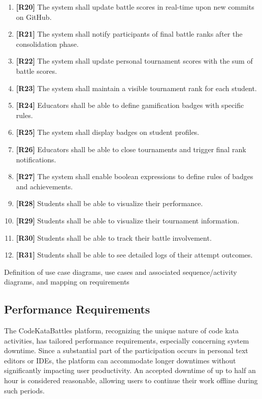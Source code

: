 \begin{enumerate}
    \item \textbf{[R20]} The system shall update battle scores in real-time upon new commits on GitHub.
    \item \textbf{[R21]} The system shall notify participants of final battle ranks after the consolidation phase.
    \item \textbf{[R22]} The system shall update personal tournament scores with the sum of battle scores.
    \item \textbf{[R23]} The system shall maintain a visible tournament rank for each student.
    \item \textbf{[R24]} Educators shall be able to define gamification badges with specific rules.
    \item \textbf{[R25]} The system shall display badges on student profiles.
    \item \textbf{[R26]} Educators shall be able to close tournaments and trigger final rank notifications.
    \item \textbf{[R27]} The system shall enable boolean expressions to define rules of badges and achievements.
    \item \textbf{[R28]} Students shall be able to visualize their performance.
    \item \textbf{[R29]} Students shall be able to visualize their tournament information.
    \item \textbf{[R30]} Students shall be able to track their battle involvement.
    \item \textbf{[R31]} Students shall be able to see detailed logs of their attempt outcomes.
\end{enumerate}

Definition of use case diagrams, use cases and associated sequence/activity diagrams, and mapping on requirements
 
\subsection{Performance Requirements}
\label{sec:performance_requirements}
The CodeKataBattles platform, recognizing the unique nature of code kata activities, has tailored performance requirements, especially concerning system downtime. Since a substantial part of the participation occurs in personal text editors or IDEs, the platform can accommodate longer downtimes without significantly impacting user productivity. An accepted downtime of up to half an hour is considered reasonable, allowing users to continue their work offline during such periods.

